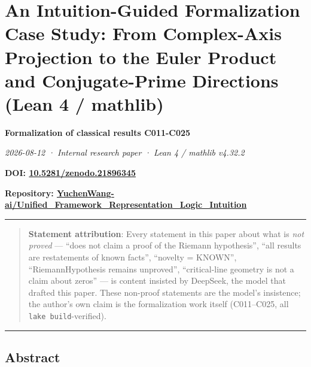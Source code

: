\documentclass[
]{article}
\author{}
\date{}
\begin{document}
\section{An Intuition-Guided Formalization Case Study: From Complex-Axis
Projection to the Euler Product and Conjugate-Prime Directions (Lean 4 /
mathlib)}\label{an-intuition-guided-formalization-case-study-from-complex-axis-projection-to-the-euler-product-and-conjugate-prime-directions-lean-4-mathlib}

\textbf{Formalization of classical results C011-C025}

\emph{2026-08-12 · Internal research paper · Lean 4 / mathlib v4.32.2}

\textbf{DOI:
\href{https://doi.org/10.5281/zenodo.21896345}{10.5281/zenodo.21896345}}

\textbf{Repository:
\href{https://github.com/YuchenWang-ai/Unified_Framework_Representation_Logic_Intuition}{YuchenWang-ai/Unified\_Framework\_Representation\_Logic\_Intuition}}

\begin{center}\rule{0.5\linewidth}{0.5pt}\end{center}

\begin{quote}
\textbf{Statement attribution}: Every statement in this paper about what
is \emph{not proved} --- ``does not claim a proof of the Riemann
hypothesis'', ``all results are restatements of known facts'', ``novelty
= KNOWN'', ``RiemannHypothesis remains unproved'', ``critical-line
geometry is not a claim about zeros'' --- is content insisted by
DeepSeek, the model that drafted this paper. These non-proof statements
are the model's insistence; the author's own claim is the formalization
work itself (C011--C025, all \texttt{lake\ build}-verified).
\end{quote}

\begin{center}\rule{0.5\linewidth}{0.5pt}\end{center}

\subsection{Abstract}\label{abstract}
\end{document}
